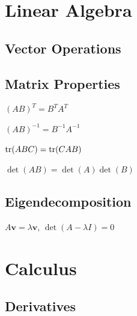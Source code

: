 
\section{Linear Algebra}

\subsection{Vector Operations}

\subsection{Matrix Properties}
\begin{deflist}
  \item[Transpose] $(AB)^T = B^T A^T$
  \item[Inverse] $(AB)^{-1} = B^{-1}A^{-1}$
  \item[Trace] $\operatorname{tr}(ABC) = \operatorname{tr}(CAB)$
  \item[Det] $\det(AB) = \det(A)\det(B)$
\end{deflist}

\subsection{Eigendecomposition}
\begin{defbox}[Eigenvalue Eq.]
$A\mathbf{v} = \lambda\mathbf{v}$, \; $\det(A - \lambda I) = 0$
\end{defbox}

\section{Calculus}

\subsection{Derivatives}

